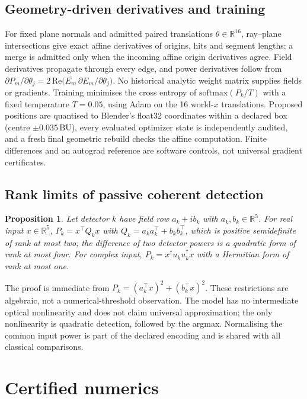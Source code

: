 \documentclass[11pt,a4paper]{article}
\newtheorem{proposition}{Proposition}
\newcommand{\BU}{\,\mathrm{BU}}
\begin{document}
\subsection{Geometry-driven derivatives and training}
For fixed plane normals and admitted paired translations $\theta \in \mathbb{R}^{16}$, ray--plane intersections give exact affine derivatives of origins, hits and segment lengths; a merge is admitted only when the incoming affine origin derivatives agree. Field derivatives propagate through every edge, and power derivatives follow from $\partial P_m/\partial\theta_j = 2\,\mathrm{Re}\big(\overline{E_m}\,\partial E_m/\partial\theta_j\big)$. No historical analytic weight matrix supplies fields or gradients. Training minimises the cross entropy of $\mathrm{softmax}(P_k/T)$ with a fixed temperature $T = 0.05$, using Adam on the 16 world-$x$ translations. Proposed positions are quantised to Blender's float32 coordinates within a declared box (centre $\pm 0.035\BU$), every evaluated optimizer state is independently audited, and a fresh final geometric rebuild checks the affine computation. Finite differences and an autograd reference are software controls, not universal gradient certificates.

\subsection{Rank limits of passive coherent detection}
\begin{proposition}\label{prop:rank}
Let detector $k$ have field row $a_k + i b_k$ with $a_k, b_k \in \mathbb{R}^5$. For real input $x \in \mathbb{R}^5$, $P_k = x^{\top} Q_k x$ with $Q_k = a_k a_k^{\top} + b_k b_k^{\top}$, which is positive semidefinite of rank at most two; the difference of two detector powers is a quadratic form of rank at most four. For complex input, $P_k = x^{\dagger} u_k u_k^{\dagger} x$ with a Hermitian form of rank at most one.
\end{proposition}
The proof is immediate from $P_k = (a_k^{\top}x)^2 + (b_k^{\top}x)^2$. These restrictions are algebraic, not a numerical-threshold observation. The model has no intermediate optical nonlinearity and does not claim universal approximation; the only nonlinearity is quadratic detection, followed by the argmax. Normalising the common input power is part of the declared encoding and is shared with all classical comparisons.

\section{Certified numerics}
\label{sec:cert}
\end{document}

